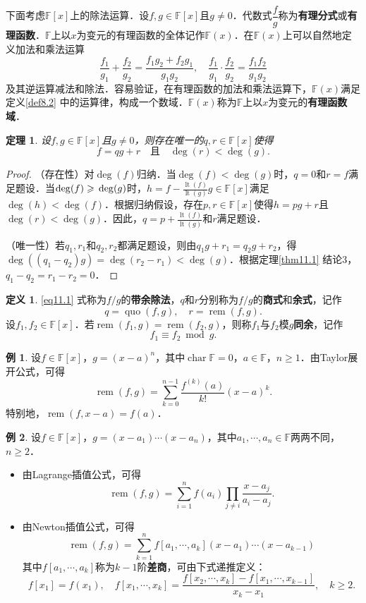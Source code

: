 \documentclass[a4paper,fontset=windows]{ctexbook}
\newtheorem{theorem}{定理}[chapter]
\theoremstyle{definition}
\newtheorem{definition}{定义}[chapter]
\newtheorem{example}{例}[chapter]
\DeclareMathOperator{\Char}{char}
\DeclareMathOperator{\lt}{lt}
\DeclareMathOperator{\quo}{quo}
\DeclareMathOperator{\rem}{rem}
\renewcommand{\ge}{\geqslant}
\begin{document}
下面考虑$\mathbb{F}[x]$上的除法运算．设$f,g\in\mathbb{F}[x]$且$g\ne 0$．代数式$\dfrac{f}{g}$称为{\bf 有理分式}或{\bf 有理函数}．\linebreak $\mathbb{F}$上以$x$为变元的有理函数的全体记作$\mathbb{F}(x)$．在$\mathbb{F}(x)$上可以自然地定义加法和乘法运算
$$\frac{f_1}{g_1}+\frac{f_2}{g_2}=\frac{f_1g_2+f_2g_1}{g_1g_2},\quad\frac{f_1}{g_1}\cdot\frac{f_2}{g_2}=\frac{f_1f_2}{g_1g_2}$$
及其逆运算减法和除法．容易验证，在有理函数的加法和乘法运算下，$\mathbb{F}(x)$满足定义\ref{def8.2} 中的运算律，构成一个数域．$\mathbb{F}(x)$称为$\mathbb{F}$上以$x$为变元的{\bf 有理函数域}．

\begin{theorem}
设$f,g\in\mathbb{F}[x]$且$g\ne 0$，则存在唯一的$q,r\in\mathbb{F}[x]$使得
\begin{equation}\label{eq11.1}
f=qg+r\quad\text{且}\quad\deg(r)<\deg(g).
\end{equation}
\end{theorem}

\begin{proof}
（存在性）对$\deg(f)$归纳．当$\deg(f)<\deg(g)$时，$q=0$和$r=f$满足题设．当$\deg(f)\ge \\ \deg(g)$时，$h=f-\frac{\lt(f)}{\lt(g)}g\in\mathbb{F}[x]$满足$\deg(h)<\deg(f)$．根据归纳假设，存在$p,r\in\mathbb{F}[x]$使得$h=pg+r$且$\deg(r)<\deg(g)$．因此，$q=p+\frac{\lt(f)}{\lt(g)}$和$r$满足题设．

（唯一性）若$q_1,r_1$和$q_2,r_2$都满足题设，则由$q_1g+r_1=q_2g+r_2$，得$\deg((q_1-q_2)g)=\deg(r_2-r_1)<\deg(g)$．根据定理\ref{thm11.1} 结论3，$q_1-q_2=r_1-r_2=0$．
\end{proof}

\begin{definition}
\eqref{eq11.1} 式称为$f/g$的{\bf 带余除法}，$q$和$r$分别称为$f/g$的{\bf 商式}和{\bf 余式}，记作
$$q=\quo(f,g),\quad r=\rem(f,g).$$
设$f_1,f_2\in\mathbb{F}[x]$．若$\rem(f_1,g)=\rem(f_2,g)$，则称$f_1$与$f_2$模$g${\bf 同余}，记作
$$f_1\equiv f_2\bmod g.$$
\end{definition}

\begin{example}
设$f\in\mathbb{F}[x]$，$g=(x-a)^n$，其中$\Char\mathbb{F}=0$，$a\in\mathbb{F}$，$n\ge 1$．由Taylor展开公式，可得
$$\rem(f,g)=\sum_{k=0}^{n-1}\frac{f^{(k)}(a)}{k!}(x-a)^k.$$
特别地，$\rem(f,x-a)=f(a)$．
\end{example}

\begin{example}
设$f\in\mathbb{F}[x]$，$g=(x-a_1)\cdots(x-a_n)$，其中$a_1,\cdots,a_n\in\mathbb{F}$两两不同，$n\ge 2$．
\begin{itemize}
\item 由Lagrange插值公式，可得
$$\rem(f,g)=\sum_{i=1}^nf(a_i)\prod_{j\ne i}\frac{x-a_j}{a_i-a_j}.$$

\item 由Newton插值公式，可得
$$\rem(f,g)=\sum_{k=1}^nf[a_1,\cdots,a_k](x-a_1)\cdots(x-a_{k-1})$$
其中$f[a_1,\cdots,a_k]$称为$k-1$阶{\bf 差商}，可由下式递推定义：
$$f[x_1]=f(x_1),\quad f[x_1,\cdots,x_k]=\frac{f[x_2,\cdots,x_k]-f[x_1,\cdots,x_{k-1}]}{x_k-x_1},\quad k\ge 2.$$
\end{itemize}
\end{example}
\end{document}
